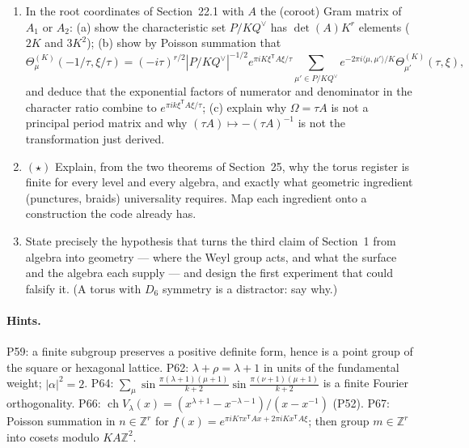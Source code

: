 \documentclass[11pt]{article}
\newcommand{\Z}{\mathbb{Z}}
\begin{document}
\begin{enumerate}[label=\textbf{P\arabic*.},leftmargin=*,start=59]
  $v_\lambda(\sigma) = S_{\lambda\sigma}/S_{0\sigma} = \sin\frac{(\lambda+1)(\sigma+1)\pi}{k+2}\big/\sin\frac{(\sigma+1)\pi}{k+2}$
  equals $\operatorname{ch}V_\lambda$ evaluated at $x = e^{-i\pi(\sigma+1)/(k+2)}$,
  and verify $v_1(\sigma)^2 = v_0(\sigma)+v_2(\sigma)$ pointwise at $k = 2$
  for $\sigma = 0,1,2$. Explain why the evaluation map is invertible and why
  this makes fusion ``multiplication of values''.
\item In the root coordinates of Section~22.1 with $A$ the (coroot) Gram
  matrix of $A_1$ or $A_2$: (a) show the characteristic set $P/KQ^\vee$ has
  $\det(A)K^r$ elements ($2K$ and $3K^2$); (b) show by Poisson summation that
  \[
  \Theta^{(K)}_\mu(-1/\tau,\xi/\tau) = (-i\tau)^{r/2}|P/KQ^\vee|^{-1/2}e^{\pi iK\xi^{\mathsf T}A\xi/\tau}
  \sum_{\mu'\in P/KQ^\vee}e^{-2\pi i\langle\mu,\mu'\rangle/K}\Theta^{(K)}_{\mu'}(\tau,\xi),
  \]
  and deduce that the exponential factors of numerator and denominator in the
  character ratio combine to $e^{\pi ik\xi^{\mathsf T}A\xi/\tau}$; (c) explain
  why $\Omega = \tau A$ is not a principal period matrix and why
  $(\tau A)\mapsto-(\tau A)^{-1}$ is not the transformation just derived.
\item $(\star)$ Explain, from the two theorems of Section~25,
  why the torus register is finite for every level and every algebra, and
  exactly what geometric ingredient (punctures, braids) universality requires.
  Map each ingredient onto a construction the code already has.
\item State precisely the hypothesis that turns the third claim of Section~1
  from algebra into geometry --- where the Weyl group acts, and what the
  surface and the algebra each supply --- and design the first experiment
  that could falsify it. (A torus with $D_6$ symmetry is a distractor: say why.)
\end{enumerate}

\paragraph{Hints.} P59: a finite subgroup preserves a positive definite
form, hence is a point group of the square or hexagonal lattice. P62: $\lambda+\rho = \lambda+1$ in units of the fundamental weight;
$|\alpha|^2 = 2$. P64: $\sum_{\mu}\sin\frac{\pi(\lambda+1)(\mu+1)}{k+2}
\sin\frac{\pi(\nu+1)(\mu+1)}{k+2}$ is a finite Fourier orthogonality. P66: $\operatorname{ch}V_\lambda(x) = (x^{\lambda+1}-x^{-\lambda-1})/(x-x^{-1})$ (P52). P67: Poisson summation in $n\in\Z^r$ for $f(x) = e^{\pi iK\tau x^{\mathsf T}Ax+2\pi iKx^{\mathsf T}A\xi}$; then group $m\in\Z^r$ into cosets modulo $KA\Z^2$.
\end{document}
